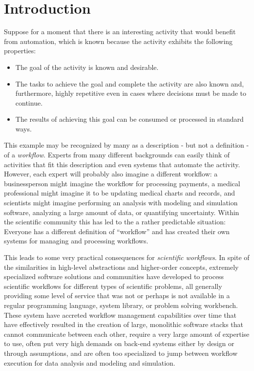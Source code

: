 \section{Introduction}

Suppose for a moment that there is an interesting activity that would benefit from automation, which is known because the activity exhibits the following properties:
\begin{itemize}
    \item The goal of the activity is known and desirable.
    \item The tasks to achieve the goal and complete the activity are also known and, furthermore, highly repetitive even in cases where decisions must be made to continue.
    \item The results of achieving this goal can be consumed or processed in standard ways.
\end{itemize}

This example may be recognized by many as a description - but not a definition - of a \textit{workflow}. Experts from many different backgrounds can easily think of activities that fit this description and even systems that automate the activity. However, each expert will probably also imagine a different workflow: a businessperson might imagine the workflow for processing payments, a medical professional might imagine it to be updating medical charts and records, and scientists might imagine performing an analysis with modeling and simulation software, analyzing a large amount of data, or quantifying uncertainty. Within the scientific community this has led to the a rather predictable situation: Everyone has a different definition of ``workflow'' and has created their own systems for managing and processing workflows.

This leads to some very practical consequences for \textit{scientific workflows}. In spite of the similarities in high-level abstractions and higher-order concepts, extremely specialized software solutions and communities have developed to process scientific workflows for different types of scientific problems, all generally providing some level of service that was not or perhaps is not available in a regular programming language, system library, or problem solving workbench. These system have accreted workflow management capabilities over time that have effectively resulted in the creation of large, monolithic software stacks that cannot communicate between each other, require a very large amount of expertise to use, often put very high demands on back-end systems either by design or through assumptions, and are often too specialized to jump between workflow execution for data analysis and modeling and simulation. 

